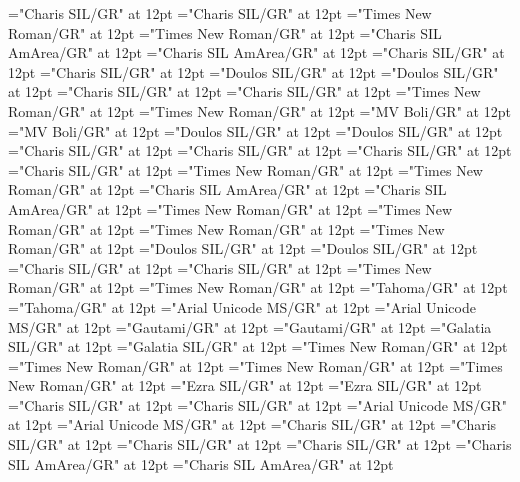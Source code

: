 \documentclass[a4paper,twoside]{article}
\begin{document}
\pagestyle{plain}
\sloppy
\setlength{\parfillskip}{0pt plus 1fil}
\font\picturepictureRight="Charis SIL/GR" at 12pt
\font\imgpicturedivpictureLeft="Charis SIL/GR" at 12pt
\font\divarIQ="Times New Roman/GR" at 12pt
\font\spanarIQ="Times New Roman/GR" at 12pt
\font\divblz="Charis SIL AmArea/GR" at 12pt
\font\spanblz="Charis SIL AmArea/GR" at 12pt
\font\divbn="Charis SIL/GR" at 12pt
\font\spanbn="Charis SIL/GR" at 12pt
\font\divbzhfonipa="Doulos SIL/GR" at 12pt
\font\spanbzhfonipa="Doulos SIL/GR" at 12pt
\font\divbzh="Charis SIL/GR" at 12pt
\font\spanbzh="Charis SIL/GR" at 12pt
\font\divde="Times New Roman/GR" at 12pt
\font\spande="Times New Roman/GR" at 12pt
\font\divdv="MV Boli/GR" at 12pt
\font\spandv="MV Boli/GR" at 12pt
\font\divenfonipa="Doulos SIL/GR" at 12pt
\font\spanenfonipa="Doulos SIL/GR" at 12pt
\font\divenGB="Charis SIL/GR" at 12pt
\font\spanenGB="Charis SIL/GR" at 12pt
\font\divenPH="Charis SIL/GR" at 12pt
\font\spanenPH="Charis SIL/GR" at 12pt
\font\diven="Times New Roman/GR" at 12pt
\font\spanen="Times New Roman/GR" at 12pt
\font\divesaab="Charis SIL AmArea/GR" at 12pt
\font\spanesaab="Charis SIL AmArea/GR" at 12pt
\font\dives="Times New Roman/GR" at 12pt
\font\spanes="Times New Roman/GR" at 12pt
\font\divfa="Times New Roman/GR" at 12pt
\font\spanfa="Times New Roman/GR" at 12pt
\font\divfrfonipa="Doulos SIL/GR" at 12pt
\font\spanfrfonipa="Doulos SIL/GR" at 12pt
\font\divfrZxxxxaudio="Charis SIL/GR" at 12pt
\font\spanfrZxxxxaudio="Charis SIL/GR" at 12pt
\font\divfr="Times New Roman/GR" at 12pt
\font\spanfr="Times New Roman/GR" at 12pt
\font\divggofonipaxemic="Tahoma/GR" at 12pt
\font\spanggofonipaxemic="Tahoma/GR" at 12pt
\font\divggoINxaheri="Arial Unicode MS/GR" at 12pt
\font\spanggoINxaheri="Arial Unicode MS/GR" at 12pt
\font\divggoTeluIN="Gautami/GR" at 12pt
\font\spanggoTeluIN="Gautami/GR" at 12pt
\font\divgrc="Galatia SIL/GR" at 12pt
\font\spangrc="Galatia SIL/GR" at 12pt
\font\divhagLatnGHfonipaxemic="Times New Roman/GR" at 12pt
\font\spanhagLatnGHfonipaxemic="Times New Roman/GR" at 12pt
\font\divhag="Times New Roman/GR" at 12pt
\font\spanhag="Times New Roman/GR" at 12pt
\font\divhbo="Ezra SIL/GR" at 12pt
\font\spanhbo="Ezra SIL/GR" at 12pt
\font\divhe="Charis SIL/GR" at 12pt
\font\spanhe="Charis SIL/GR" at 12pt
\font\divhi="Arial Unicode MS/GR" at 12pt
\font\spanhi="Arial Unicode MS/GR" at 12pt
\font\divhu="Charis SIL/GR" at 12pt
\font\spanhu="Charis SIL/GR" at 12pt
\font\divibafonipa="Charis SIL/GR" at 12pt
\font\spanibafonipa="Charis SIL/GR" at 12pt
\font\diviba="Charis SIL AmArea/GR" at 12pt
\font\spaniba="Charis SIL AmArea/GR" at 12pt
\end{document}
